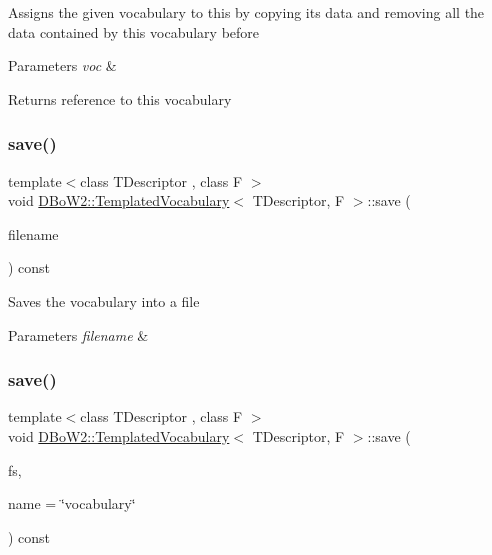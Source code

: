 Assigns the given vocabulary to this by copying its data and removing all the data contained by this vocabulary before 
\begin{DoxyParams}{Parameters}
{\em voc} & \\
\hline
\end{DoxyParams}
\begin{DoxyReturn}{Returns}
reference to this vocabulary 
\end{DoxyReturn}
\mbox{\label{class_d_bo_w2_1_1_templated_vocabulary_a92ca49bd6600bddbad145fb6e0543fa1}} 
\subsubsection{\texorpdfstring{save()}{save()}\hspace{0.1cm}{\footnotesize\ttfamily [1/2]}}
{\footnotesize\ttfamily template$<$class T\+Descriptor , class F $>$ \\
void \mbox{\hyperlink{class_d_bo_w2_1_1_templated_vocabulary}{D\+Bo\+W2\+::\+Templated\+Vocabulary}}$<$ T\+Descriptor, F $>$\+::save (\begin{DoxyParamCaption}\item[{const std\+::string \&}]{filename }\end{DoxyParamCaption}) const}

Saves the vocabulary into a file 
\begin{DoxyParams}{Parameters}
{\em filename} & \\
\hline
\end{DoxyParams}
\mbox{\label{class_d_bo_w2_1_1_templated_vocabulary_a3039529c46f02b795450f4fba2207339}} 
\subsubsection{\texorpdfstring{save()}{save()}\hspace{0.1cm}{\footnotesize\ttfamily [2/2]}}
{\footnotesize\ttfamily template$<$class T\+Descriptor , class F $>$ \\
void \mbox{\hyperlink{class_d_bo_w2_1_1_templated_vocabulary}{D\+Bo\+W2\+::\+Templated\+Vocabulary}}$<$ T\+Descriptor, F $>$\+::save (\begin{DoxyParamCaption}\item[{cv\+::\+File\+Storage \&}]{fs,  }\item[{const std\+::string \&}]{name = {\ttfamily \char`\"{}vocabulary\char`\"{}} }\end{DoxyParamCaption}) const\hspace{0.3cm}{\ttfamily [virtual]}}

